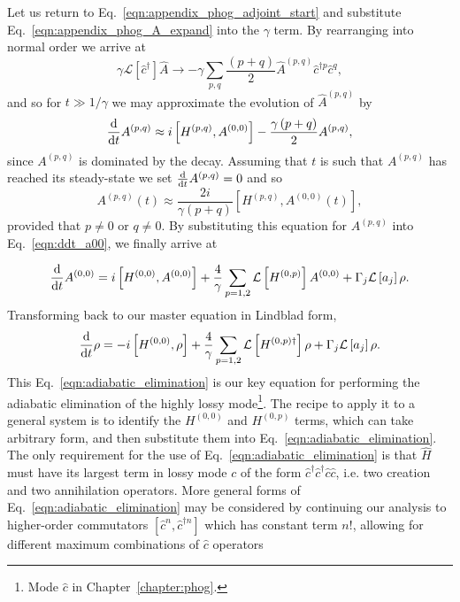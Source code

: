 \noindent Let us return to Eq.~\ref{eqn:appendix_phog_adjoint_start} and substitute Eq.~\ref{eqn:appendix_phog_A_expand} into the $\gamma$ term. By rearranging into normal order we arrive at
\begin{equation}
\gamma \mathcal{L}\left[\hat{c}^\dagger\right] \hat{A} \rightarrow - \gamma \sum_{p, q}\frac{\left(p + q\right)}{2} \hat{A}^{\left(p, q\right)} \hat{c}^{\dagger p} \hat{c}^q,
\end{equation} %
and so for $t \gg 1/\gamma$ we may approximate the evolution of $\hat{A}^{\left(p, q\right)}$ by
\begin{equation}
\frac{\mathrm{d}}{\mathrm{d}t} A^{\left(p, q\right)} \approx i \left[ H^{\left(p, q\right)}, A^{\left(0, 0\right)}\right] - \frac{\gamma \left(p + q\right)}{2} A^{\left(p, q\right)},
\end{equation}
since $A^{\left(p, q\right)}$ is dominated by the decay. Assuming that $t$ is such that $A^{\left(p, q\right)}$ has reached its steady-state we set $\frac{\mathrm{d}}{\mathrm{d}t} A^{\left(p, q\right)} = 0$ and so
\begin{equation}
A^{\left(p, q\right)} \left(t\right) \approx \frac{2 i}{\gamma \left(p + q\right)} \left[H^{\left(p, q\right)}, A^{\left(0, 0\right)}\left(t\right)\right],
\end{equation}
provided that $p \ne 0$ or $q \ne 0$. By substituting this equation for $A^{\left(p, q\right)}$ into Eq.~\ref{eqn:ddt_a00}, we finally arrive at

\begin{equation}
\ddt A^{\left(0, 0\right)} = i \left[ H^{\left(0, 0\right)}, A^{\left(0, 0\right)}\right] + \frac{4}{\gamma} \sum_{p = {1, 2}} \mathcal{L}\left[ H^{\left(0, p\right)} \right] A^{\left(0, 0\right)} + \Gamma_j \mathcal{L}\left[a_j\right] \rho. %
\end{equation}
Transforming back to our master equation in Lindblad form,
\begin{equation}\label{eqn:adiabatic_elimination}
\frac{\mathrm{d}}{\mathrm{d}t} \rho = - i \left[ H^{\left(0, 0\right)}, \rho\right] + \frac{4}{\gamma} \sum_{p = 1, 2} \mathcal{L} \left[H^{\left(0, p\right)\dagger}\right] \rho + \Gamma_j \mathcal{L}\left[a_j\right] \rho.
\end{equation}
This Eq.~\ref{eqn:adiabatic_elimination} is our key equation for performing the adiabatic elimination of the highly lossy mode\footnote{Mode $\hat{c}$ in Chapter~\ref{chapter:phog}.}. The recipe to apply it to a general system is to identify the $H^{\left(0, 0\right)}$ and $H^{\left(0, p\right)}$ terms, which can take arbitrary form, and then substitute them into Eq.~\ref{eqn:adiabatic_elimination}. The only requirement for the use of Eq.~\ref{eqn:adiabatic_elimination} is that $\hat{H}$ must have its largest term in lossy mode $c$ of the form $\hat{c}^\dagger \hat{c}^\dagger \hat{c} \hat{c}$, i.e. two creation and two annihilation operators. More general forms of Eq.~\ref{eqn:adiabatic_elimination} may be considered by continuing our analysis to higher-order commutators $\left[ \hat{c}^n, \hat{c}^{\dagger n}\right]$ which has constant term $n!$, allowing for different maximum combinations of $\hat{c}$ operators 

